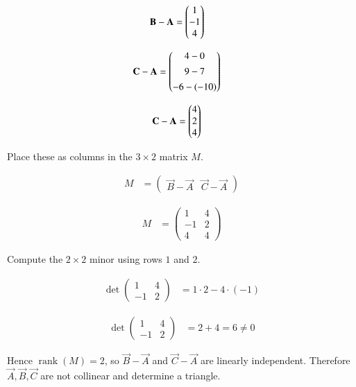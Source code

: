 \documentclass[journal]{IEEEtran}
\begin{document}
\begin{align}
\mathbf{B}-\mathbf{A} &= \begin{pmatrix}1\\-1\\4\end{pmatrix}
\end{align}

\begin{align}
\mathbf{C}-\mathbf{A} &= \begin{pmatrix}4-0\\[4pt]9-7\\[4pt]-6-(-10)\end{pmatrix}
\end{align}

\begin{align}
\mathbf{C}-\mathbf{A} &= \begin{pmatrix}4\\2\\4\end{pmatrix}
\end{align}

Place these as columns in the $3\times 2$ matrix $M$.

\begin{align}
M &= \begin{pmatrix} \vec{B}-\vec{A} & \vec{C}-\vec{A} \end{pmatrix}
\end{align}

\begin{align}
M &= \begin{pmatrix}
1 & 4\\[4pt]
-1 & 2\\[4pt]
4 & 4
\end{pmatrix}
\end{align}

Compute the $2\times2$ minor using rows $1$ and $2$.

\begin{align}
\det\begin{pmatrix}1 & 4\\[4pt] -1 & 2\end{pmatrix}
&= 1\cdot 2 - 4\cdot(-1)
\end{align}

\begin{align}
\det\begin{pmatrix}1 & 4\\[4pt] -1 & 2\end{pmatrix}
&= 2 + 4 = 6 \neq 0
\end{align}

Hence $\operatorname{rank}(M)=2$, so $\vec{B}-\vec{A}$ and $\vec{C}-\vec{A}$ are linearly independent.  
Therefore $\vec{A},\vec{B},\vec{C}$ are not collinear and determine a triangle.
\end{document}

